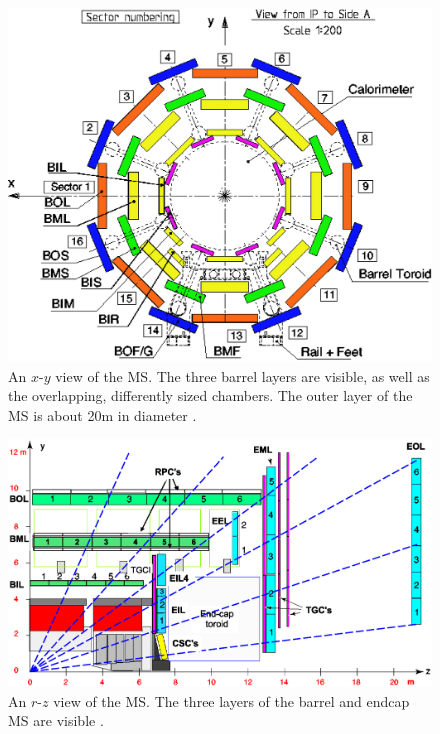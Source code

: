 \begin{centering}
\begin{figure}[!htb]
\myfloatalign
\includegraphics[width=.90\linewidth]{figures/atlas/Muon_sector_numbering.eps}
\caption{An $x$-$y$ view of the \ac{MS}. The three barrel layers are visible, as well as the overlapping, differently sized chambers. The outer layer of the \ac{MS} is about 20m in diameter \cite{PERF-2007-01}.}
\label{fig:muon_xy}
\end{figure}
\end{centering}

\begin{centering}
\begin{figure}[!htb]
\myfloatalign
\includegraphics[width=.90\linewidth]{figures/atlas/Muon_rz_large_sect_6.eps}
\caption{An $r$-$z$ view of the \ac{MS}. The three layers of the barrel and endcap \ac{MS} are visible \cite{PERF-2007-01}.}
\label{fig:muon_rz}
\end{figure}
\end{centering}

